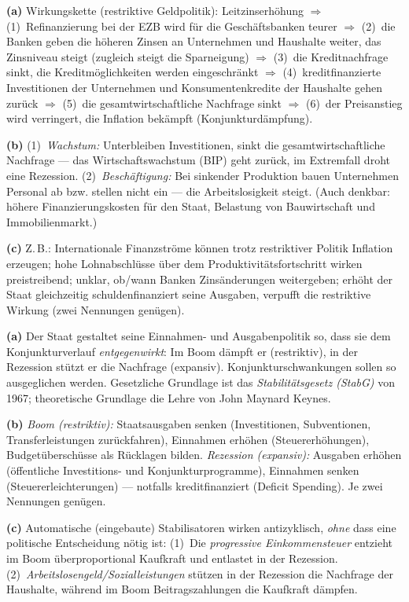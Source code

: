 \documentclass[11pt, a4paper]{article}
\begin{document}
\begin{loesung}[title={Lösung Aufgabe~3 --- EZB-Zinserhöhung und ihre Wirkungen}]
\textbf{(a)} Wirkungskette (restriktive Geldpolitik): Leitzinserhöhung $\Rightarrow$
(1)~Refinanzierung bei der EZB wird für die Geschäftsbanken teurer $\Rightarrow$
(2)~die Banken geben die höheren Zinsen an Unternehmen und Haushalte weiter, das
Zinsniveau steigt (zugleich steigt die Sparneigung) $\Rightarrow$ (3)~die Kreditnachfrage
sinkt, die Kreditmöglichkeiten werden eingeschränkt $\Rightarrow$ (4)~kreditfinanzierte
Investitionen der Unternehmen und Konsumentenkredite der Haushalte gehen zurück
$\Rightarrow$ (5)~die gesamtwirtschaftliche Nachfrage sinkt $\Rightarrow$ (6)~der
Preisanstieg wird verringert, die Inflation bekämpft (Konjunkturdämpfung).

\textbf{(b)} (1)~\emph{Wachstum:} Unterbleiben Investitionen, sinkt die
gesamtwirtschaftliche Nachfrage --- das Wirtschaftswachstum (BIP) geht zurück, im
Extremfall droht eine Rezession. (2)~\emph{Beschäftigung:} Bei sinkender Produktion bauen
Unternehmen Personal ab bzw. stellen nicht ein --- die Arbeitslosigkeit steigt. (Auch
denkbar: höhere Finanzierungskosten für den Staat, Belastung von Bauwirtschaft und
Immobilienmarkt.)

\textbf{(c)} Z.\,B.: Internationale Finanzströme können trotz restriktiver Politik
Inflation erzeugen; hohe Lohnabschlüsse über dem Produktivitätsfortschritt wirken
preistreibend; unklar, ob/wann Banken Zinsänderungen weitergeben; erhöht der Staat
gleichzeitig schuldenfinanziert seine Ausgaben, verpufft die restriktive Wirkung (zwei
Nennungen genügen).
\end{loesung}

\begin{loesung}[title={Lösung Aufgabe~4 --- Antizyklische Fiskalpolitik}]
\textbf{(a)} Der Staat gestaltet seine Einnahmen- und Ausgabenpolitik so, dass sie dem
Konjunkturverlauf \emph{entgegenwirkt}: Im Boom dämpft er (restriktiv), in der Rezession
stützt er die Nachfrage (expansiv). Konjunkturschwankungen sollen so ausgeglichen werden.
Gesetzliche Grundlage ist das \emph{Stabilitätsgesetz (StabG)} von 1967; theoretische
Grundlage die Lehre von John Maynard Keynes.

\textbf{(b)} \emph{Boom (restriktiv):} Staatsausgaben senken (Investitionen, Subventionen,
Transferleistungen zurückfahren), Einnahmen erhöhen (Steuererhöhungen), Budgetüberschüsse
als Rücklagen bilden. \emph{Rezession (expansiv):} Ausgaben erhöhen (öffentliche
Investitions- und Konjunkturprogramme), Einnahmen senken (Steuererleichterungen) ---
notfalls kreditfinanziert (Deficit Spending). Je zwei Nennungen genügen.

\textbf{(c)} Automatische (eingebaute) Stabilisatoren wirken antizyklisch, \emph{ohne}
dass eine politische Entscheidung nötig ist: (1)~Die \emph{progressive Einkommensteuer}
entzieht im Boom überproportional Kaufkraft und entlastet in der Rezession.
(2)~\emph{Arbeitslosengeld/Sozialleistungen} stützen in der Rezession die Nachfrage der
Haushalte, während im Boom Beitragszahlungen die Kaufkraft dämpfen.
\end{loesung}
\end{document}
